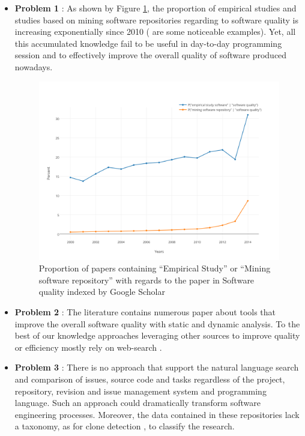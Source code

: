 \begin{itemize}
	\item {\bf Problem 1} : As shown by Figure \ref{fig:scholar}, the proportion of empirical studies and studies based on mining software repositories regarding to software quality is increasing exponentially since 2010 (\cite{Kim2011a,Lee2011a,Sun2011,Bhattacharya2011,Tian2012a,Zimmermann2012, Shang2013,Chen2014,Mcintosh,Hemmati2015} are some noticeable examples).
	Yet, all this accumulated knowledge fail to be useful in day-to-day programming session and to effectively improve the overall quality of software produced nowadays.

	\begin{figure}[h!]
	  \centering
	  	    \includegraphics[scale=0.7]{media/scholar.png}
	    \caption{Proportion of papers containing ``Empirical Study'' or ``Mining software repository'' with regards to the paper in Software quality indexed by Google Scholar	\label{fig:scholar}}
	\end{figure}

	\item {\bf Problem 2} : The literature contains numerous paper about tools that improve the overall software quality with static \cite{Dangel2000, burn2003checkstyle,Hovemeyer2007,Moha2010} and dynamic \cite{Nayrolles,Nayrolles2013a,Palma2013} analysis. To the best of our knowledge approaches leveraging other sources to improve quality or efficiency mostly rely on web-search \cite{Brandt2009,Rahman2013,Montandon2013}.

	\item {\bf Problem 3} : There is no approach that support the natural language search and comparison of issues, source code and tasks regardless of the project, repository, revision and issue management system and programming language. Such an approach could dramatically transform software engineering processes. Moreover, the data contained in these repositories lack a taxonomy, as for clone detection \cite{CoryKapser}, to classify the research.
\end{itemize}

